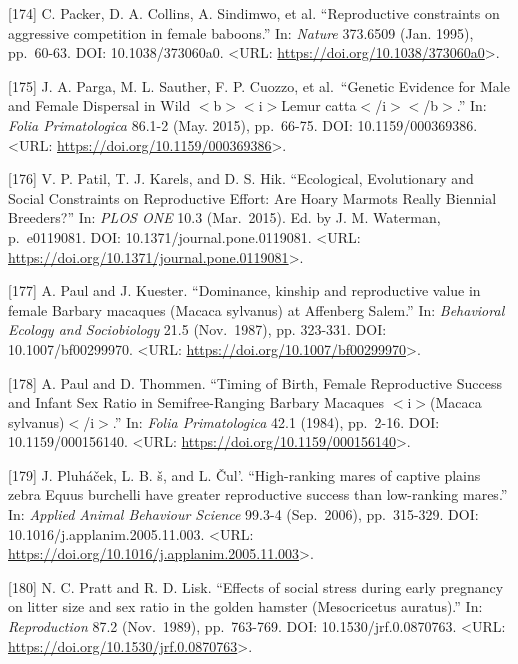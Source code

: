\documentclass[
]{article}
\begin{document}
{[}174{]} C. Packer, D. A. Collins, A. Sindimwo, et al. ``Reproductive
constraints on aggressive competition in female baboons.'' In:
\emph{Nature} 373.6509 (Jan. 1995), pp.~60-63. DOI: 10.1038/373060a0.
\textless URL: \url{https://doi.org/10.1038/373060a0}\textgreater.

{[}175{]} J. A. Parga, M. L. Sauther, F. P. Cuozzo, et al.~``Genetic
Evidence for Male and Female Dispersal in Wild
\(\less\)b\(\greater\)\(\less\)i\(\greater\)Lemur
catta\(\less\)/i\(\greater\)\(\less\)/b\(\greater\).'' In: \emph{Folia
Primatologica} 86.1-2 (May. 2015), pp.~66-75. DOI: 10.1159/000369386.
\textless URL: \url{https://doi.org/10.1159/000369386}\textgreater.

{[}176{]} V. P. Patil, T. J. Karels, and D. S. Hik. ``Ecological,
Evolutionary and Social Constraints on Reproductive Effort: Are Hoary
Marmots Really Biennial Breeders?'' In: \emph{PLOS ONE} 10.3
(Mar.~2015). Ed. by J. M. Waterman, p.~e0119081. DOI:
10.1371/journal.pone.0119081. \textless URL:
\url{https://doi.org/10.1371/journal.pone.0119081}\textgreater.

{[}177{]} A. Paul and J. Kuester. ``Dominance, kinship and reproductive
value in female Barbary macaques (Macaca sylvanus) at Affenberg Salem.''
In: \emph{Behavioral Ecology and Sociobiology} 21.5 (Nov.~1987), pp.
323-331. DOI: 10.1007/bf00299970. \textless URL:
\url{https://doi.org/10.1007/bf00299970}\textgreater.

{[}178{]} A. Paul and D. Thommen. ``Timing of Birth, Female Reproductive
Success and Infant Sex Ratio in Semifree-Ranging Barbary Macaques
\(\less\)i\(\greater\)(Macaca sylvanus)\(\less\)/i\(\greater\).'' In:
\emph{Folia Primatologica} 42.1 (1984), pp.~2-16. DOI:
10.1159/000156140. \textless URL:
\url{https://doi.org/10.1159/000156140}\textgreater.

{[}179{]} J. Pluháček, L. B. š, and L. Čul'\ik. ``High-ranking mares of
captive plains zebra Equus burchelli have greater reproductive success
than low-ranking mares.'' In: \emph{Applied Animal Behaviour Science}
99.3-4 (Sep.~2006), pp.~315-329. DOI: 10.1016/j.applanim.2005.11.003.
\textless URL:
\url{https://doi.org/10.1016/j.applanim.2005.11.003}\textgreater.

{[}180{]} N. C. Pratt and R. D. Lisk. ``Effects of social stress during
early pregnancy on litter size and sex ratio in the golden hamster
(Mesocricetus auratus).'' In: \emph{Reproduction} 87.2 (Nov.~1989),
pp.~763-769. DOI: 10.1530/jrf.0.0870763. \textless URL:
\url{https://doi.org/10.1530/jrf.0.0870763}\textgreater.
\end{document}
